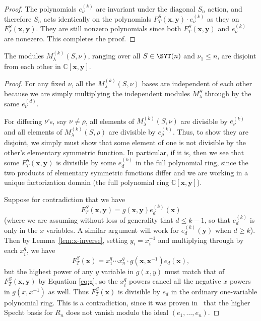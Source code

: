 \begin{proof}
	The polynomials $e_\nu^{(k)}$ are invariant under the diagonal $S_n$ action, and therefore $S_n$ acts identically on the polynomials $F_T^S(\mathbf{x},\mathbf{y})\cdot e_\nu^{(k)}$ as they on $F_T^S(\mathbf{x},\mathbf{y})$.  They are still nonzero polynomials since both $F_T^S(\mathbf{x},\mathbf{y})$ and $e_\nu^{(k)}$ are nonezero.  This completes the proof.
\end{proof}

\begin{lemma}
	The modules $M^{(k)}_\lambda(S,\nu)$, ranging over all $S\in \SYT(n)$ and $\nu_1\le n$, are disjoint from each other in $\mathbb{C}[\mathbf{x},\mathbf{y}]$.
\end{lemma}

\begin{proof}
	For any fixed $\nu$, all the $M_\lambda^{(k)}(S,\nu)$ bases are independent of each other because we are simply multiplying the independent modules $M_\lambda^S$ through by the same $e_\nu^{(d)}$.  
	
	For differing $\nu$'s, say $\nu\neq \rho$, all elements of $M_\lambda^{(k)}(S,\nu)$ are divisible by $e_\nu^{(k)}$ and all elements of $M_\lambda^{(k)}(S,\rho)$ are divisible by $e_{\rho}^{(k)}$.  Thus, to show they are disjoint, we simply must show that some element of one is not divisible by the other's elementary symmetric function.  In particular, if it is, then we see that some $F_T^S(\mathbf{x},\mathbf{y})$ is divisible by some $e_d^{(k)}$ in the full polynomial ring, since the two products of elementary symmetric functions differ and we are working in a unique factorization domain (the full polynomial ring $\mathbb{C}[\mathbf{x},\mathbf{y}]$).
	
	Suppose for contradiction that we have \begin{equation}\label{eq:g}
	F_T^{S}(\mathbf{x},\mathbf{y})=g(\mathbf{x},\mathbf{y})e_d^{(k)}(\mathbf{x})
	\end{equation} (where we are assuming without loss of generality that $d\le k-1$, so that $e_d^{(k)}$ is only in the $x$ variables.  A similar argument will work for $e_d^{(k)}(\mathbf{y})$ when $d\ge k$).  Then by Lemma~\ref{lem:x-inverse}, setting $y_i=x_i^{-1}$ and multiplying through by each $x_i^q$, we have $$F_T^S(\mathbf{x})=x_1^q\cdots x_n^q \cdot g(\mathbf{x},\mathbf{x}^{-1})e_d(\mathbf{x}),$$ but the highest power of any $y$ variable in $g(x,y)$ must match that of $F_T^S(\mathbf{x},\mathbf{y})$ by Equation \eqref{eq:g}, so the $x_i^q$ powers cancel all the negative $x$ powers in $g(x,x^{-1})$ as well.  Thus $F_T^S(\mathbf{x})$ is divisible by $e_d$ in the ordinary one-variable polynomial ring.  This is a contradiction, since it was proven in~\cite{ATY} that the higher Specht basis for $R_n$ does not vanish modulo the ideal $(e_1,\ldots,e_n)$.  
\end{proof}


